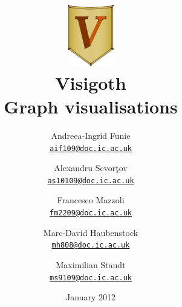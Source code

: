\documentclass[a4paper,11pt,titlepage]{article}
\let\stdhref\href
\renewcommand{\href}[2]{\stdhref{#1}{\texttt{#2}}}
\newcommand{\mailto}[1]{\href{mailto:#1}{#1}}
\begin{document}
\title{\includegraphics[width=2cm]{v.png}\\
  \Huge Visigoth\\\Large Graph visualisations}
\author{
  Andreea-Ingrid Funie\\\mailto{aif109@doc.ic.ac.uk}\and
  Alexandru Scvor\c tov\\\mailto{as10109@doc.ic.ac.uk}\and
  Francesco Mazzoli\\\mailto{fm2209@doc.ic.ac.uk}\and
  Marc-David Haubenstock\\\mailto{mh808@doc.ic.ac.uk}\and
  Maximilian Staudt\\\mailto{ms9109@doc.ic.ac.uk}
}
\date{January 2012}
\maketitle
\end{document}
